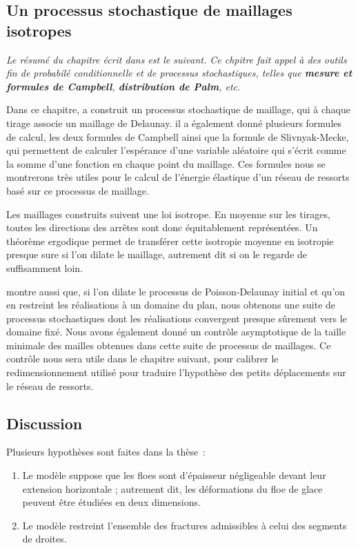 \subsection{Un processus stochastique de maillages isotropes} 

\textit{Le résumé du chapitre écrit dans \parencite[p.136]{balasoiu2020halthesis} est le suivant. Ce chpitre fait appel à des outils fin de probabilé conditionnelle et de processus stochastiques, telles que \textbf{mesure et formules de Campbell}, \textbf{distribution de Palm}, etc. }

Dans ce chapitre, \citeauthor{balasoiu2020halthesis} a construit un processus stochastique de maillage, qui à chaque tirage associe un maillage de Delaunay. il a également donné plusieurs formules de calcul, les deux formules de Campbell ainsi que la formule de Slivnyak-Mecke, qui permettent de calculer l’espérance d’une variable aléatoire qui s’écrit comme la somme d’une fonction en chaque point du maillage. Ces formules nous se montrerons très utiles pour le calcul de
l’énergie élastique d’un réseau de ressorts basé sur ce processus de maillage.

Les maillages construits suivent une loi isotrope. En moyenne sur les tirages, toutes les directions des arrêtes sont donc équitablement représentées. Un théorème ergodique permet de transférer cette isotropie moyenne en isotropie presque sure si l’on dilate le maillage, autrement dit si on le regarde de suffisamment loin.

\citeauthor{balasoiu2020halthesis} montre aussi que, si l’on dilate le processus de Poisson-Delaunay initial et qu’on en restreint les réalisations à un domaine du plan, nous obtenons une suite de processus stochastiques dont les réalisations convergent presque sûrement vers le domaine fixé. Nous avons également donné un contrôle asymptotique de la taille minimale des mailles
obtenues dans cette suite de processus de maillages. Ce contrôle nous sera utile dans le chapitre suivant, pour calibrer le redimensionnement utilisé pour traduire l’hypothèse des petits déplacements sur le réseau de ressorts.













\subsection{Discussion}

Plusieurs hypothèses sont faites dans la thèse :
\begin{enumerate}
    \item Le modèle suppose que les floes sont d’épaisseur négligeable devant leur extension horizontale ; autrement dit, les déformations du floe de glace peuvent être étudiées en deux dimensions.
    \item Le modèle restreint l’ensemble des fractures admissibles à celui des segments de droites.
\end{enumerate}